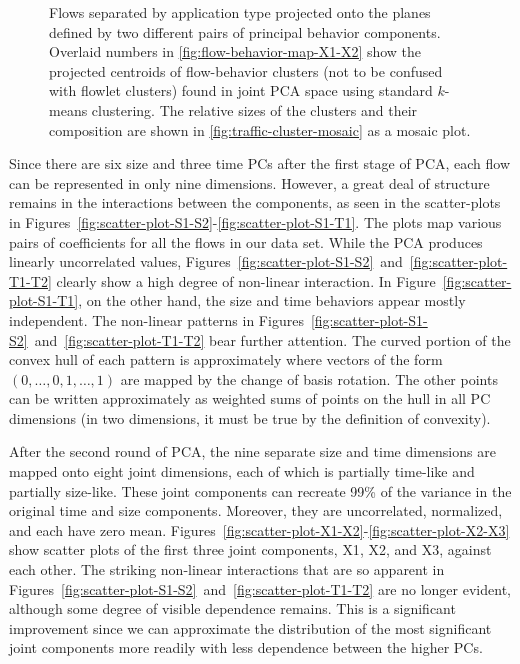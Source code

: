 \documentclass[conference]{IEEEtran}
\newcommand{\caps}[1]{{\small{#1}}}
\begin{document}
\begin{figure}
\begin{center}
{\label{fig:traffic-cluster-mosaic}}
\end{center}
\vspace{-0.4em}
\caption{Flows separated by application type projected onto the planes defined by two different pairs of principal behavior components. %
Overlaid numbers in \ref{fig:flow-behavior-map-X1-X2} show the projected centroids of flow-behavior clusters (not to be confused with flowlet clusters) found in joint {\footnotesize{PCA}} space using standard $k$-means clustering. The relative sizes of the clusters and their composition are shown in \ref{fig:traffic-cluster-mosaic} as a mosaic plot.}
\label{fig:flow-behavior-maps} 
\vspace{-0.9em}
\end{figure}

Since there are six size and three time \caps{PC}s after the first stage of \caps{PCA}, each flow can be represented in only nine dimensions. However, a great deal of structure remains in the interactions between the components, as seen in the scatter-plots in Figures~\ref{fig:scatter-plot-S1-S2}-\ref{fig:scatter-plot-S1-T1}. The plots map various pairs of coefficients for all the flows in our data set. While the \caps{PCA} produces linearly uncorrelated values, Figures~\ref{fig:scatter-plot-S1-S2}~and~\ref{fig:scatter-plot-T1-T2} clearly show a high degree of non-linear interaction. In Figure~\ref{fig:scatter-plot-S1-T1}, on the other hand, the size and time behaviors appear mostly independent. The non-linear patterns in Figures~\ref{fig:scatter-plot-S1-S2}~and~\ref{fig:scatter-plot-T1-T2} bear further attention. The curved portion of the convex hull of each pattern is approximately where vectors of the form {\small{$(0,\dots,0,1,\dots,1)$}} are mapped by the change of basis rotation. The other points can be written approximately as weighted sums of points on the hull in all \caps{PC} dimensions (in two dimensions, it must be true by the definition of convexity).

After the second round of \caps{PCA}, the nine separate size and time dimensions are mapped onto eight joint dimensions, each of which is partially time-like and partially size-like. These joint components can recreate 99\% of the variance in the original time and size components. Moreover, they are uncorrelated, normalized, and each have zero mean. Figures~\ref{fig:scatter-plot-X1-X2}-\ref{fig:scatter-plot-X2-X3} show scatter plots of the first three joint components, \caps{X1}, \caps{X2}, and \caps{X3}, against each other. The striking non-linear interactions that are so apparent in Figures~\ref{fig:scatter-plot-S1-S2}~and~\ref{fig:scatter-plot-T1-T2} are no longer evident, although some degree of visible dependence remains.
This is a significant improvement since we can approximate the distribution of the most significant joint components more readily with less dependence between the higher \caps{PC}s.
\end{document}
